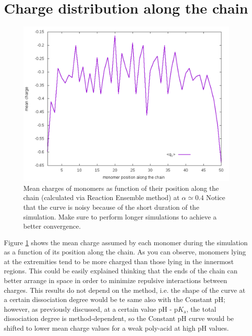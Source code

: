 \documentclass[
a4paper,                        %
11pt,                           %
twoside,                        %
footsepline,                    %
headsepline,                    %
headexclude,                    %
footexclude,                    %
pagesize,                       %
]{scrartcl}
\begin{document}
\section{Charge distribution along the chain}

\begin{figure}[h]
	\centering
	\includegraphics[scale=0.6]{figures/qdistrib.pdf}
	\caption{Mean charges of monomers as function of their position along the chain (calculated via Reaction Ensemble method) at $\alpha \simeq 0.4$ Notice that the curve is noisy because of the short duration of the simulation. Make sure to perform longer simulations to achieve a better convergence.}
	\label{qdistrib}
\end{figure}
Figure \ref{qdistrib} shows the mean charge assumed by each monomer during the simulation as a function of its position along the chain. As you can observe, monomers lying at the extremities tend to be more charged than those lying in the innermost regions. This could be easily explained thinking that the ends of the chain can better arrange in space in order to minimize repulsive interactions between charges. This results do not depend on the method, i.e. the shape of the curve at a certain dissociation degree would be te same also with the Constant pH; however, as previously discussed, at a certain value $\text{pH - p}K_\text{a}$, the total dissociation degree is method-dependent, so the Constant pH curve would be shifted to lower mean charge values for a weak poly-acid at high pH values.



\end{document}
